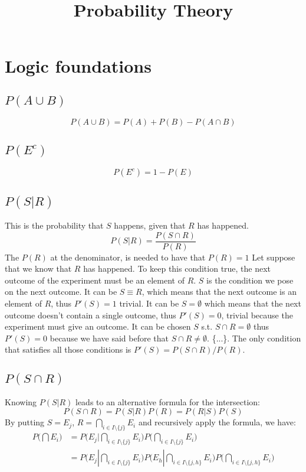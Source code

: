 \documentclass[12pt]{article}
\begin{document}
\title{Probability Theory}
\maketitle
\clearpage
\tableofcontents
\cleardoublepage
\section{Logic foundations}
\subsection{$P(A\cup B)$}
$$P(A\cup B)=P(A)+P(B)-P(A\cap B)$$
\subsection{$P(E^c)$}
$$P(E^c)=1-P(E)$$
\subsection{$P(S|R)$}
This is the probability that $S$ happens, given that $R$ has happened.
$$P(S|R)=\frac{P(S\cap R)}{P(R)}$$
The $P(R)$ at the denominator, is needed to have that $P(R)=1$
Let suppose that we know that $R$ has happened. To keep this condition true, the next outcome of the experiment must be an element of $R$. $S$ is the condition we pose on the next outcome. It can be $S\equiv R$, which means that the next outcome is an element of $R$, thus $P'(S)=1$ trivial. It can be $S=\emptyset$ which means that the next outcome doesn't contain a single outcome, thus $P'(S)=0$, trivial because the experiment must give an outcome. It can be chosen $S$ s.t. $S\cap R=\emptyset$ thus $P'(S)=0$ because we have said before that $S\cap R\neq \emptyset$. \{...\}. The only condition that satisfies all those conditions is $P'(S)=P(S\cap R)/P(R)$.
\subsection{$P(S\cap R)$}
Knowing $P(S|R)$ leads to an alternative formula for the intersection:
$$P(S\cap R)=P(S|R)P(R)=P(R|S)P(S)$$
By putting $S=E_j$, $R=\bigcap_{i\in I\setminus\{j\}}E_i$ and recursively apply the formula, we have:
\begin{align*}
	P\bigg(\bigcap E_i\bigg)&=P\bigg(E_j|\bigcap_{i\in I\setminus\{j\}}E_i\bigg)P\bigg(\bigcap_{i\in I\setminus\{j\}}E_i\bigg)\\
	&=P\bigg(E_j|\bigcap_{i\in I\setminus\{j\}}E_i\bigg)P\bigg(E_h|\bigcap_{i\in I\setminus\{j,h\}}E_i\bigg)P\bigg(\bigcap_{i\in I\setminus\{j,h\}}E_i\bigg)
\end{align*}
\end{document}
